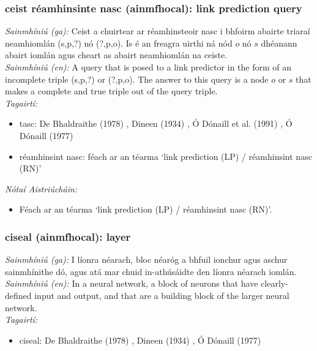 \documentclass{article}
\begin{document}
\subsubsection*{ceist réamhinsinte nasc (ainmfhocal): link prediction query}
 \noindent \textit{Sainmhíniú (ga):} Ceist a chuirtear ar réamhinsteoir nasc i bhfoirm abairte triaraí neamhiomlán (s,p,?) nó (?,p,o). Is é an freagra uirthi ná nód $o$ nó $s$ dhéanann abairt iomlán agus cheart as abairt neamhiomlán na ceiste.
\\
 \noindent \textit{Sainmhíniú (en):} A query that is posed to a link predictor in the form of an incomplete triple (s,p,?) or (?,p,o). The answer to this query is a node $o$ or $s$ that makes a complete and true triple out of the query triple.
\\
 \noindent \textit{Tagairtí:}
\begin{itemize}
	\item tasc: De Bhaldraithe (1978) \cite{de-bhaldraithe}, Dineen (1934) \cite{dineen}, Ó Dónaill et al. (1991) \cite{focloir-beag}, Ó Dónaill (1977) \cite{odonaill}
	\item réamhinsint nasc: féach ar an téarma `link prediction (LP) / réamhinsint nasc (RN)'
\end{itemize}

 \noindent \textit{Nótaí Aistriúcháin:}
\begin{itemize}
	\item Féach ar an téarma `link prediction (LP) / réamhinsint nasc (RN)'.
\end{itemize}


\subsubsection*{ciseal (ainmfhocal): layer}
 \noindent \textit{Sainmhíniú (ga):} I líonra néarach, bloc néaróg a bhfuil ionchur agus aschur sainmhínithe dó, agus atá mar chuid in-athúsáidte den líonra néarach iomlán.
\\
 \noindent \textit{Sainmhíniú (en):} In a neural network, a block of neurons that have clearly-defined input and output, and that are a building block of the larger neural network.
\\
 \noindent \textit{Tagairtí:}
\begin{itemize}
	\item ciseal: De Bhaldraithe (1978) \cite{de-bhaldraithe}, Dineen (1934) \cite{dineen}, Ó Dónaill (1977) \cite{odonaill}
\end{itemize}
\end{document}
